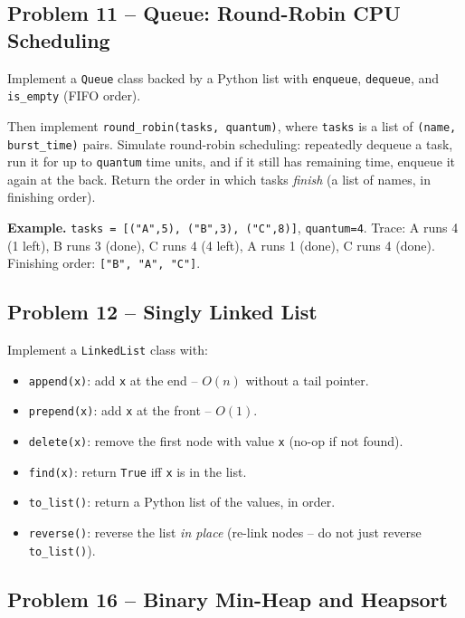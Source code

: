 \documentclass[11pt]{article}
\begin{document}
\subsection*{Problem 11 -- Queue: Round-Robin CPU Scheduling}

Implement a \texttt{Queue} class backed by a Python list with \texttt{enqueue},
\texttt{dequeue}, and \texttt{is\_empty} (FIFO order).

Then implement \texttt{round\_robin(tasks, quantum)}, where \texttt{tasks} is a list of
\texttt{(name, burst\_time)} pairs. Simulate round-robin scheduling: repeatedly dequeue a
task, run it for up to \texttt{quantum} time units, and if it still has remaining time,
enqueue it again at the back. Return the order in which tasks \emph{finish} (a list of
names, in finishing order).

\textbf{Example.} \texttt{tasks = [("A",5), ("B",3), ("C",8)]}, \texttt{quantum=4}.
Trace: A runs 4 (1 left), B runs 3 (done), C runs 4 (4 left), A runs 1 (done), C runs 4
(done). Finishing order: \texttt{["B", "A", "C"]}.

\subsection*{Problem 12 -- Singly Linked List}

Implement a \texttt{LinkedList} class with:
\begin{itemize}
    \item \texttt{append(x)}: add \texttt{x} at the end -- $O(n)$ without a tail pointer.
    \item \texttt{prepend(x)}: add \texttt{x} at the front -- $O(1)$.
    \item \texttt{delete(x)}: remove the first node with value \texttt{x} (no-op if not
    found).
    \item \texttt{find(x)}: return \texttt{True} iff \texttt{x} is in the list.
    \item \texttt{to\_list()}: return a Python list of the values, in order.
    \item \texttt{reverse()}: reverse the list \emph{in place} (re-link nodes -- do not
    just reverse \texttt{to\_list()}).
\end{itemize}

\subsection*{Problem 16 -- Binary Min-Heap and Heapsort}
\end{document}
